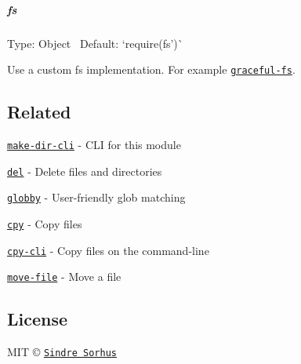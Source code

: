 \subparagraph*{fs}

Type\+: {\ttfamily Object}~\newline
 Default\+: `require(\textquotesingle{}fs')\`{}

Use a custom {\ttfamily fs} implementation. For example \href{https://github.com/isaacs/node-graceful-fs}{\tt {\ttfamily graceful-\/fs}}.

\subsection*{Related}


\begin{DoxyItemize}
\item \href{https://github.com/sindresorhus/make-dir-cli}{\tt make-\/dir-\/cli} -\/ C\+LI for this module
\item \href{https://github.com/sindresorhus/del}{\tt del} -\/ Delete files and directories
\item \href{https://github.com/sindresorhus/globby}{\tt globby} -\/ User-\/friendly glob matching
\item \href{https://github.com/sindresorhus/cpy}{\tt cpy} -\/ Copy files
\item \href{https://github.com/sindresorhus/cpy-cli}{\tt cpy-\/cli} -\/ Copy files on the command-\/line
\item \href{https://github.com/sindresorhus/move-file}{\tt move-\/file} -\/ Move a file
\end{DoxyItemize}

\subsection*{License}

M\+IT © \href{https://sindresorhus.com}{\tt Sindre Sorhus} 